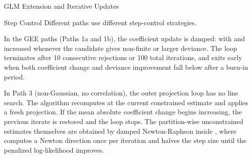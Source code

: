 \begin{Section}{GLM Extension and Iterative Updates}
%
\begin{SubSection}{Step Control}
Different paths use different step-control strategies.

In the GEE paths (Paths 1a and 1b), the coefficient update is damped:
with  and  increased whenever the
candidate gives non-finite or larger deviance. The loop terminates after
10 consecutive rejections or 100 total iterations, and exits early when
both coefficient change and deviance improvement fall below 
after a burn-in period.

In Path 3 (non-Gaussian, no correlation), the outer projection loop has
no line search. The algorithm recomputes  at the current
constrained estimate and applies a fresh projection. If the mean absolute
coefficient change begins increasing, the previous iterate is restored
and the loop stops. The partition-wise unconstrained estimates themselves
are obtained by damped Newton-Raphson inside
, where
 computes a Newton direction once per
iteration and halves the step size until the penalized log-likelihood
improves.
\end{SubSection}

\end{Section}
%

